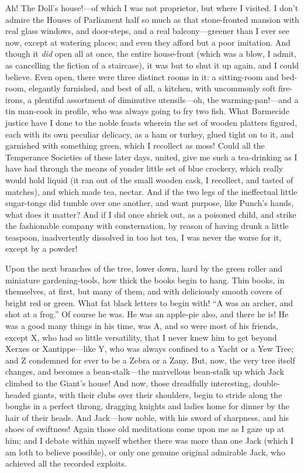 Ah!  The Doll's house!---of which I was not proprietor, but where I
visited.  I don't admire the Houses of Parliament half so much as
that stone-fronted mansion with real glass windows, and door-steps,
and a real balcony---greener than I ever see now, except at watering
places; and even they afford but a poor imitation.  And though it
\emph{did} open all at once, the entire house-front (which was a blow, I
admit, as cancelling the fiction of a staircase), it was but to shut
it up again, and I could believe.  Even open, there were three
distinct rooms in it:  a sitting-room and bed-room, elegantly
furnished, and best of all, a kitchen, with uncommonly soft fire-%
irons, a plentiful assortment of diminutive utensils---oh, the
warming-pan!---and a tin man-cook in profile, who was always going to
fry two fish.  What Barmecide justice have I done to the noble
feasts wherein the set of wooden platters figured, each with its own
peculiar delicacy, as a ham or turkey, glued tight on to it, and
garnished with something green, which I recollect as moss!  Could
all the Temperance Societies of these later days, united, give me
such a tea-drinking as I have had through the means of yonder little
set of blue crockery, which really would hold liquid (it ran out of
the small wooden cask, I recollect, and tasted of matches), and
which made tea, nectar.  And if the two legs of the ineffectual
little sugar-tongs did tumble over one another, and want purpose,
like Punch's hands, what does it matter?  And if I did once shriek
out, as a poisoned child, and strike the fashionable company with
consternation, by reason of having drunk a little teaspoon,
inadvertently dissolved in too hot tea, I was never the worse for
it, except by a powder!

Upon the next branches of the tree, lower down, hard by the green
roller and miniature gardening-tools, how thick the books begin to
hang.  Thin books, in themselves, at first, but many of them, and
with deliciously smooth covers of bright red or green.  What fat
black letters to begin with!  ``A was an archer, and shot at a frog.''
Of course he was.  He was an apple-pie also, and there he is!  He
was a good many things in his time, was A, and so were most of his
friends, except X, who had so little versatility, that I never knew
him to get beyond Xerxes or Xantippe---like Y, who was always
confined to a Yacht or a Yew Tree; and Z condemned for ever to be a
Zebra or a Zany.  But, now, the very tree itself changes, and
becomes a bean-stalk---the marvellous bean-stalk up which Jack
climbed to the Giant's house!  And now, those dreadfully
interesting, double-headed giants, with their clubs over their
shoulders, begin to stride along the boughs in a perfect throng,
dragging knights and ladies home for dinner by the hair of their
heads.  And Jack---how noble, with his sword of sharpness, and his
shoes of swiftness!  Again those old meditations come upon me as I
gaze up at him; and I debate within myself whether there was more
than one Jack (which I am loth to believe possible), or only one
genuine original admirable Jack, who achieved all the recorded
exploits.

